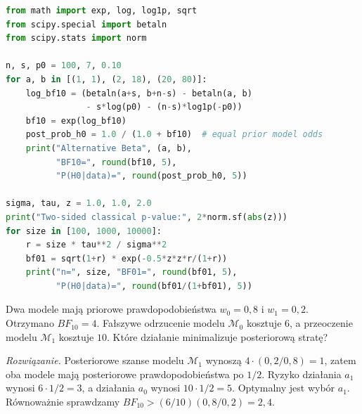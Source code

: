 \begin{lstlisting}[language=Python,caption={Kompletny program: iloraz Bayesa dla wadliwych produktów i paradoks Jeffreysa--Lindleya (Python, SciPy).}]
from math import exp, log, log1p, sqrt
from scipy.special import betaln
from scipy.stats import norm

n, s, p0 = 100, 7, 0.10
for a, b in [(1, 1), (2, 18), (20, 80)]:
    log_bf10 = (betaln(a+s, b+n-s) - betaln(a, b)
                - s*log(p0) - (n-s)*log1p(-p0))
    bf10 = exp(log_bf10)
    post_prob_h0 = 1.0 / (1.0 + bf10)  # equal prior model odds
    print("Alternative Beta", (a, b),
          "BF10=", round(bf10, 5),
          "P(H0|data)=", round(post_prob_h0, 5))

sigma, tau, z = 1.0, 1.0, 2.0
print("Two-sided classical p-value:", 2*norm.sf(abs(z)))
for size in [100, 1000, 10000]:
    r = size * tau**2 / sigma**2
    bf01 = sqrt(1+r) * exp(-0.5*z*z*r/(1+r))
    print("n=", size, "BF01=", round(bf01, 5),
          "P(H0|data)=", round(bf01/(1+bf01), 5))
\end{lstlisting}

\begin{zadanie}
Dwa modele mają priorowe prawdopodobieństwa $w_0=0{,}8$
i $w_1=0{,}2$. Otrzymano $BF_{10}=4$.
Fałszywe odrzucenie modelu $\mathcal M_0$ kosztuje $6$,
a przeoczenie modelu $\mathcal M_1$ kosztuje $10$.
Które działanie minimalizuje posteriorową stratę?
\par\emph{Rozwiązanie.} Posteriorowe szanse modelu
$\mathcal M_1$ wynoszą $4\cdot(0{,}2/0{,}8)=1$,
zatem oba modele mają posteriorowe prawdopodobieństwa po $1/2$.
Ryzyko działania $a_1$ wynosi $6\cdot1/2=3$,
a działania $a_0$ wynosi $10\cdot1/2=5$.
Optymalny jest wybór $a_1$. Równoważnie sprawdzamy
$BF_{10}>(6/10)(0{,}8/0{,}2)=2{,}4$.
\end{zadanie}


